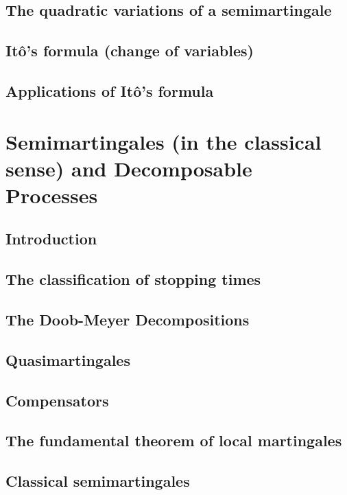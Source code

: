 \documentclass[openany,oneside]{book}
\theoremstyle{definition}
\theoremstyle{remark}
\begin{document}
\section{The quadratic variations of a semimartingale}

\section{It\^o's formula (change of variables)}

\section{Applications of It\^o's formula}


\chapter{Semimartingales (in the classical sense) and Decomposable Processes}

\section{Introduction}

\section{The classification of stopping times}

\section{The Doob-Meyer Decompositions}

\section{Quasimartingales}

\section{Compensators}

\section{The fundamental theorem of local martingales}

\section{Classical semimartingales}
\end{document}
